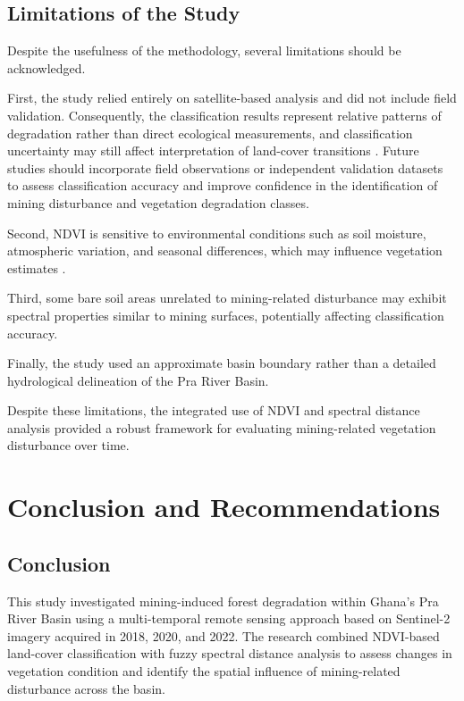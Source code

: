 \documentclass[a4paper,12pt]{report}
\begin{document}
\section{Limitations of the Study}

Despite the usefulness of the methodology, several limitations should be acknowledged.

First, the study relied entirely on satellite-based analysis and did not include field validation. Consequently, the classification results represent relative patterns of degradation rather than direct ecological measurements, and classification uncertainty may still affect interpretation of land-cover transitions \citep{foody2002status}. Future studies should incorporate field observations or independent validation datasets to assess classification accuracy and improve confidence in the identification of mining disturbance and vegetation degradation classes.

Second, NDVI is sensitive to environmental conditions such as soil moisture, atmospheric variation, and seasonal differences, which may influence vegetation estimates \citep{huete2002overview,pettorelli2005ndvi}.

Third, some bare soil areas unrelated to mining-related disturbance may exhibit spectral properties similar to mining surfaces, potentially affecting classification accuracy.

Finally, the study used an approximate basin boundary rather than a detailed hydrological delineation of the Pra River Basin.

Despite these limitations, the integrated use of NDVI and spectral distance analysis provided a robust framework for evaluating mining-related vegetation disturbance over time.

\FloatBarrier

\chapter{Conclusion and Recommendations}

\section{Conclusion}

This study investigated mining-induced forest degradation within Ghana’s Pra River Basin using a multi-temporal remote sensing approach based on Sentinel-2 imagery acquired in 2018, 2020, and 2022. The research combined NDVI-based land-cover classification with fuzzy spectral distance analysis to assess changes in vegetation condition and identify the spatial influence of mining-related disturbance across the basin.
\end{document}

